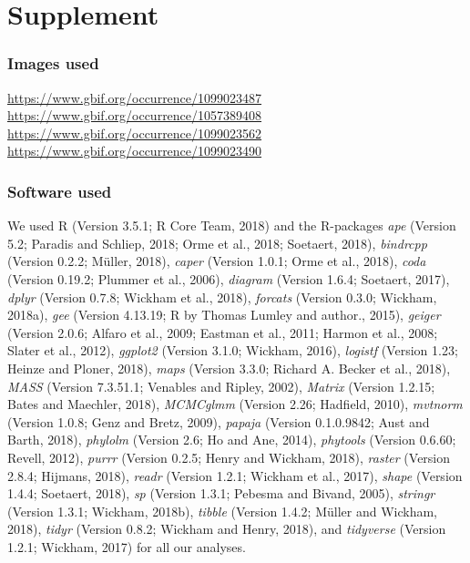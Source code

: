 \documentclass[man,floatsintext]{apa6}
\theoremstyle{definition}
\theoremstyle{definition}
\theoremstyle{definition}
\theoremstyle{remark}
\begin{document}
\endgroup

\newpage
\setcounter{table}{0}  \renewcommand{\thetable}{S\arabic{table}} \setcounter{figure}{0} \renewcommand{\thefigure}{S\arabic{figure}}

\hypertarget{supplement}{%
\section{Supplement}\label{supplement}}

\hypertarget{images-used}{%
\subsubsection{Images used}\label{images-used}}

\url{https://www.gbif.org/occurrence/1099023487}
\url{https://www.gbif.org/occurrence/1057389408}
\url{https://www.gbif.org/occurrence/1099023562}
\url{https://www.gbif.org/occurrence/1099023490}

\hypertarget{software-used}{%
\subsubsection{Software used}\label{software-used}}

We used R (Version 3.5.1; R Core Team, 2018) and the R-packages
\emph{ape} (Version 5.2; Paradis and Schliep, 2018; Orme et al., 2018;
Soetaert, 2018), \emph{bindrcpp} (Version 0.2.2; Müller, 2018),
\emph{caper} (Version 1.0.1; Orme et al., 2018), \emph{coda} (Version
0.19.2; Plummer et al., 2006), \emph{diagram} (Version 1.6.4; Soetaert,
2017), \emph{dplyr} (Version 0.7.8; Wickham et al., 2018),
\emph{forcats} (Version 0.3.0; Wickham, 2018a), \emph{gee} (Version
4.13.19; R by Thomas Lumley and author., 2015), \emph{geiger} (Version
2.0.6; Alfaro et al., 2009; Eastman et al., 2011; Harmon et al., 2008;
Slater et al., 2012), \emph{ggplot2} (Version 3.1.0; Wickham, 2016),
\emph{logistf} (Version 1.23; Heinze and Ploner, 2018), \emph{maps}
(Version 3.3.0; Richard A. Becker et al., 2018), \emph{MASS} (Version
7.3.51.1; Venables and Ripley, 2002), \emph{Matrix} (Version 1.2.15;
Bates and Maechler, 2018), \emph{MCMCglmm} (Version 2.26; Hadfield,
2010), \emph{mvtnorm} (Version 1.0.8; Genz and Bretz, 2009),
\emph{papaja} (Version 0.1.0.9842; Aust and Barth, 2018), \emph{phylolm}
(Version 2.6; Ho and Ane, 2014), \emph{phytools} (Version 0.6.60;
Revell, 2012), \emph{purrr} (Version 0.2.5; Henry and Wickham, 2018),
\emph{raster} (Version 2.8.4; Hijmans, 2018), \emph{readr} (Version
1.2.1; Wickham et al., 2017), \emph{shape} (Version 1.4.4; Soetaert,
2018), \emph{sp} (Version 1.3.1; Pebesma and Bivand, 2005),
\emph{stringr} (Version 1.3.1; Wickham, 2018b), \emph{tibble} (Version
1.4.2; Müller and Wickham, 2018), \emph{tidyr} (Version 0.8.2; Wickham
and Henry, 2018), and \emph{tidyverse} (Version 1.2.1; Wickham, 2017)
for all our analyses.
\end{document}
